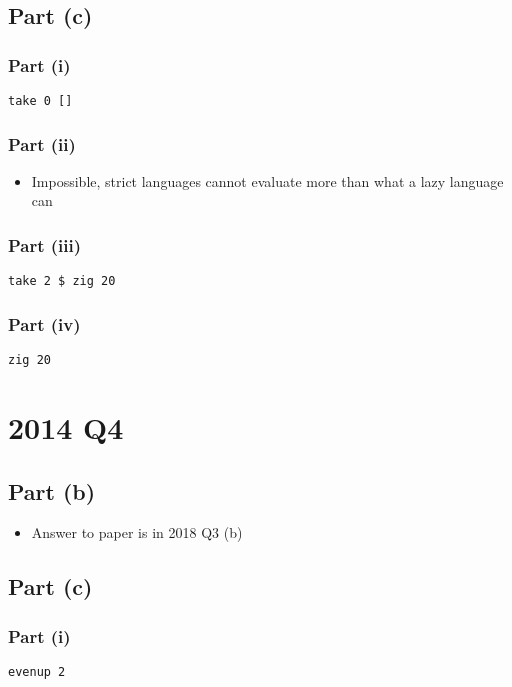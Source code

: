\documentclass[11pt]{article}
\begin{document}
\subsection{Part (c)}
\label{sec:org6d44a8c}
\subsubsection{Part (i)}
\label{sec:orge25cc2e}
\begin{verbatim}
take 0 []
\end{verbatim}
\subsubsection{Part (ii)}
\label{sec:org17e8ffe}
\begin{itemize}
\item Impossible, strict languages cannot evaluate more than
what a lazy language can
\end{itemize}
\subsubsection{Part (iii)}
\label{sec:orgfd323d0}
\begin{verbatim}
take 2 $ zig 20
\end{verbatim}
\subsubsection{Part (iv)}
\label{sec:orgee51798}
\begin{verbatim}
zig 20
\end{verbatim}
\section{2014 Q4}
\label{sec:orgbd5e8fc}
\subsection{Part (b)}
\label{sec:org885e4a6}
\begin{itemize}
\item Answer to paper is in 2018 Q3 (b)
\end{itemize}
\subsection{Part (c)}
\label{sec:orgc0f7df6}
\subsubsection{Part (i)}
\label{sec:orgb3ecdd9}
\begin{verbatim}
evenup 2
\end{verbatim}
\end{document}
